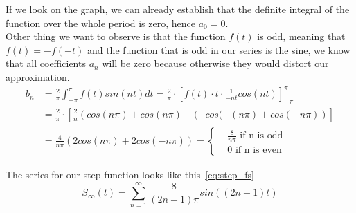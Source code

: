 \documentclass[titlepage]{article}
\begin{document}
    If we look on the graph, we can already establish that the definite integral
    of the function over the whole period is zero, hence $a_0 = 0$. \\


    Other thing we want to observe is that the function $f(t)$ is odd, meaning
    that \textbf{$f(t) = -f(-t)$} and the function that is odd in our series is
    the sine, we know that all coefficients $a_n$ will be zero because otherwise
    they would distort our approximation.
    \begin{equation}
    \begin{split}
        b_n & = \frac{2}{\pi}\int_{-\pi}^{\pi}f(t)sin(nt)dt 
        = \frac{2}{\pi} \cdot \left[f(t)\cdot t \cdot \frac{1}{-nt}cos(nt)\right]_{-\pi}^{\pi} \\
        & = \frac{2}{\pi} \cdot \left[\frac{2}{n}\left(cos(n\pi) + cos(n\pi)
        - (-cos(-(n\pi) + cos(-n\pi) \right)\right] \\
        & = \frac{4}{n\pi}\left(2cos(n\pi) + 2cos(-n\pi)\right) = 
        \begin{cases} 
            & \frac{8}{n\pi} \text{ if n is odd} \\
            & 0 \text{ if n is even}
        \end{cases} 
    \end{split}
    \end{equation}
    
    The series for our step function looks like this~\eqref{eq:step_fs}
    \begin{equation}\label{eq:step_fs}
        S_\infty(t) = \sum_{n=1}^{\infty}\frac{8}{(2n-1)\pi}sin((2n - 1)t)
    \end{equation}
\end{document}
